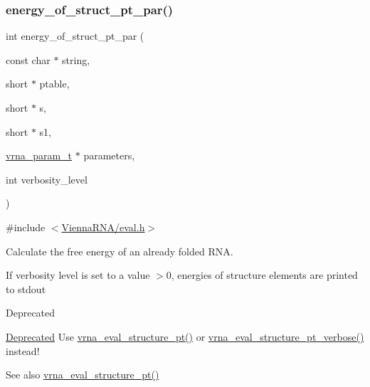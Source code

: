 \subsubsection{\texorpdfstring{energy\_of\_struct\_pt\_par()}{energy\_of\_struct\_pt\_par()}}
{\footnotesize\ttfamily int energy\+\_\+of\+\_\+struct\+\_\+pt\+\_\+par (\begin{DoxyParamCaption}\item[{const char $\ast$}]{string,  }\item[{short $\ast$}]{ptable,  }\item[{short $\ast$}]{s,  }\item[{short $\ast$}]{s1,  }\item[{\mbox{\hyperlink{group__energy__parameters_ga8a69ca7d787e4fd6079914f5343a1f35}{vrna\+\_\+param\+\_\+t}} $\ast$}]{parameters,  }\item[{int}]{verbosity\+\_\+level }\end{DoxyParamCaption})}



{\ttfamily \#include $<$\mbox{\hyperlink{eval_8h}{Vienna\+R\+N\+A/eval.\+h}}$>$}



Calculate the free energy of an already folded R\+NA. 

If verbosity level is set to a value $>$0, energies of structure elements are printed to stdout

\begin{DoxyRefDesc}{Deprecated}
\item[\mbox{\hyperlink{deprecated__deprecated000054}{Deprecated}}]Use \mbox{\hyperlink{group__eval_gadbd09372ddfd7a450bbd590c96a6bfe4}{vrna\+\_\+eval\+\_\+structure\+\_\+pt()}} or \mbox{\hyperlink{group__eval_ga8a517cfeeae8c376ae7b1e0c401d38b4}{vrna\+\_\+eval\+\_\+structure\+\_\+pt\+\_\+verbose()}} instead!\end{DoxyRefDesc}


\begin{DoxySeeAlso}{See also}
\mbox{\hyperlink{group__eval_gadbd09372ddfd7a450bbd590c96a6bfe4}{vrna\+\_\+eval\+\_\+structure\+\_\+pt()}}
\end{DoxySeeAlso}

